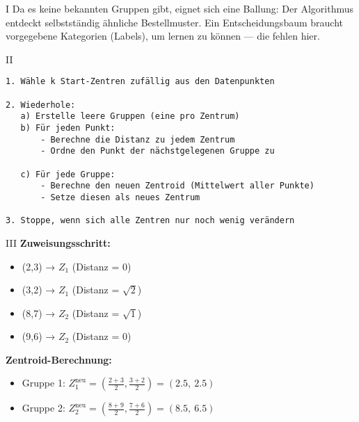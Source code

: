 \begin{aufgabe}{I}
Da es keine bekannten Gruppen gibt, eignet sich eine Ballung: Der Algorithmus entdeckt selbstständig ähnliche Bestellmuster.  
Ein Entscheidungsbaum braucht vorgegebene Kategorien (Labels), um lernen zu können — die fehlen hier.
\end{aufgabe}

\begin{aufgabe}{II}
\begin{verbatim}
1. Wähle k Start-Zentren zufällig aus den Datenpunkten

2. Wiederhole:
   a) Erstelle leere Gruppen (eine pro Zentrum)
   b) Für jeden Punkt:
       - Berechne die Distanz zu jedem Zentrum
       - Ordne den Punkt der nächstgelegenen Gruppe zu

   c) Für jede Gruppe:
       - Berechne den neuen Zentroid (Mittelwert aller Punkte)
       - Setze diesen als neues Zentrum

3. Stoppe, wenn sich alle Zentren nur noch wenig verändern
\end{verbatim}
\end{aufgabe}


\begin{aufgabe}{III}
\textbf{Zuweisungsschritt:}
\begin{itemize}
  \item (2,3) → $Z_1$ (Distanz = 0)
  \item (3,2) → $Z_1$ (Distanz = $\sqrt{2}$)
  \item (8,7) → $Z_2$ (Distanz = $\sqrt{1}$)
  \item (9,6) → $Z_2$ (Distanz = 0)
\end{itemize}

\textbf{Zentroid-Berechnung:}
\begin{itemize}
  \item Gruppe 1: $Z_1^{\text{neu}} = \left( \frac{2+3}{2}, \frac{3+2}{2} \right) = (2.5,\ 2.5)$
  \item Gruppe 2: $Z_2^{\text{neu}} = \left( \frac{8+9}{2}, \frac{7+6}{2} \right) = (8.5,\ 6.5)$
\end{itemize}
\end{aufgabe}